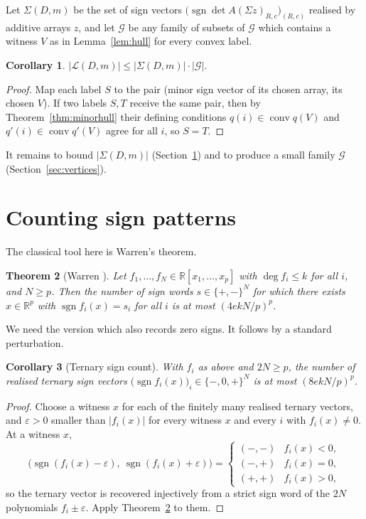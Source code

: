 \documentclass[11pt,a4paper]{article}
\theoremstyle{plain}
\newtheorem{theorem}{Theorem}[section]
\newtheorem{corollary}[theorem]{Corollary}
\theoremstyle{definition}
\DeclareMathOperator{\conv}{conv}
\DeclareMathOperator{\sgn}{sgn}
\newcommand{\R}{\mathbb{R}}
\newcommand{\Grid}{\mathcal{G}}
\begin{document}
Let $\Sigma(D,m)$ be the set of sign vectors $\bigl(\sgn\det A(\Sigma z)_{R,c}\bigr)_{(R,c)}$
realised by additive arrays $z$, and let $\mathcal{G}$ be any family of subsets of $\Grid$
which contains a witness $V$ as in Lemma~\ref{lem:hull} for every convex label.

\begin{corollary}\label{cor:product}
$\bigl|\mathcal{L}(D,m)\bigr|\le\bigl|\Sigma(D,m)\bigr|\cdot|\mathcal{G}|$.
\end{corollary}

\begin{proof}
Map each label $S$ to the pair (minor sign vector of its chosen array, its chosen $V$).
If two labels $S,T$ receive the same pair, then by Theorem~\ref{thm:minorhull} their
defining conditions $q(i)\in\conv q(V)$ and $q'(i)\in\conv q'(V)$ agree for all $i$, so
$S=T$.
\end{proof}

It remains to bound $|\Sigma(D,m)|$ (Section~\ref{sec:signs}) and to produce a small
family $\mathcal{G}$ (Section~\ref{sec:vertices}).

\section{Counting sign patterns}\label{sec:signs}

The classical tool here is Warren's theorem.

\begin{theorem}[Warren {\cite[Theorem~3]{warren}}]\label{thm:warren}
Let $f_1,\dots,f_N\in\R[x_1,\dots,x_p]$ with $\deg f_i\le k$ for all $i$, and $N\ge p$. Then the
number of sign words $s\in\{+,-\}^N$ for which there exists $x\in\R^p$ with
$\sgn f_i(x)=s_i$ for all $i$ is at most $(4ekN/p)^{p}$.
\end{theorem}

We need the version which also records zero signs. It follows by a standard perturbation.

\begin{corollary}[Ternary sign count]\label{cor:ternary}
With $f_i$ as above and $2N\ge p$, the number of realised \emph{ternary} sign vectors
$\bigl(\sgn f_i(x)\bigr)_{i}\in\{-,0,+\}^N$ is at most $(8ekN/p)^{p}$.
\end{corollary}

\begin{proof}
Choose a witness $x$ for each of the finitely many realised ternary vectors, and $\varepsilon>0$
smaller than $|f_i(x)|$ for every witness $x$ and every $i$ with $f_i(x)\ne0$. At a witness $x$,
\[
  \bigl(\sgn(f_i(x)-\varepsilon),\ \sgn(f_i(x)+\varepsilon)\bigr)=
  \begin{cases}
   (-,-) & f_i(x)<0,\\
   (-,+) & f_i(x)=0,\\
   (+,+) & f_i(x)>0,
  \end{cases}
\]
so the ternary vector is recovered injectively from a strict sign word of the $2N$ polynomials
$f_i\pm\varepsilon$. Apply Theorem~\ref{thm:warren} to them.
\end{proof}
\end{document}
